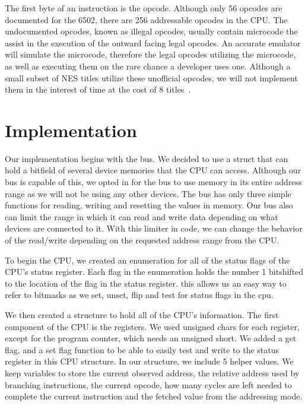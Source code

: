 \documentclass[12pt]{article}
\begin{document}
The first byte of an instruction is the opcode. Although only 56 opcodes are documented for the 6502,
there are 256 addressable opcodes in the CPU. The undocumented opcodes, known as illegal opcodes, usually
contain microcode the assist in the execution of the outward facing legal opcodes. An accurate emulator
will simulate the microcode, therefore the legal opcodes utilizing the microcode, as well as executing
them on the rare chance a developer uses one. Although a small subset of NES titles utilize these unofficial
opcodes, we will not implement them in the interest of time at the cost of 8 titles~\cite{illegal_ops}.

\section{Implementation}
\label{sec:implementation}

Our implementation begins with the bus. We decided to use a struct that can hold a bitfield
of several device memories that the CPU can access. Although our bus is capable of this, we opted
in for the bus to use memory in its entire address range as we will not be using any other devices.
The bus has only three simple functions for reading, writing and resetting the values in memory.
Our bus also can limit the range in which it can read and write data depending on what devices
are connected to it. With this limiter in code, we can change the behavior of the read/write depending on
the requested address range from the CPU.

To begin the CPU, we created an enumeration for all of the status flags of the CPU's status register.
Each flag in the enumeration holds the number 1 bitshifted to the location of the flag in the status register.
this allows us an easy way to refer to bitmasks as we set, unset, flip and test for status flags in the cpu.

We then created a structure to hold all of the CPU's information. The first component of the CPU is the 
registers. We used unsigned chars for each register, except for the program counter, which needs an unsigned short.
We added a get flag, and a set flag function to be able to easily test and write to the status register
in this CPU structure. In our structure, we include 5 helper values. We keep variables to store the current
observed address, the relative address used by branching instructions, the current opcode, how many
cycles are left needed to complete the current instruction and the fetched value from the addressing mode.
\end{document}
